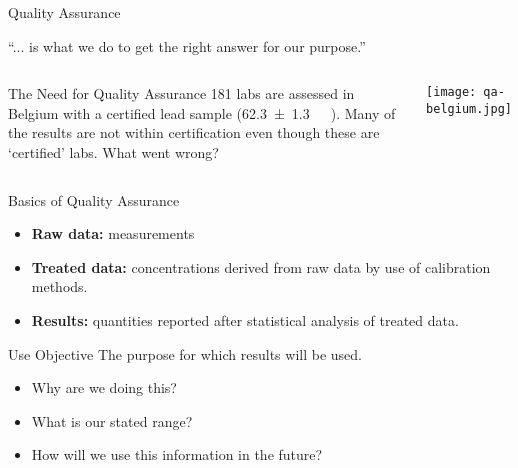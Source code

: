 \documentclass[notes=hide]{beamer}
\begin{document}
\begin{frame}{Quality Assurance}
	\begin{center}
	``... is what we do to get the right answer for our purpose.''
	\end{center}

	\begin{columns}
		\begin{exampleblock}{The Need for Quality Assurance}
			181 labs are assessed in Belgium with a certified lead
			sample (\SI{62.3 +- 1.3}{\nano\Molar}~). Many of the
			results are not within certification even though these
			are `certified' labs. What went wrong?
		\end{exampleblock}
		\begin{center}
			\texttt{[image: qa-belgium.jpg]}
		\end{center}
	\end{columns}
\end{frame}

\begin{frame}{Basics of Quality Assurance}
	\begin{itemize}
		\item \textbf{Raw data:} measurements
		\item \textbf{Treated data:} concentrations derived from raw
			data \alert{by use of calibration methods}.
		\item \textbf{Results:} quantities reported \alert{after
			statistical analysis} of treated data.
	\end{itemize}

	\begin{block}{Use Objective}
		The purpose for which results will be used.

		\begin{itemize}
			\item Why are we doing this?
			\item What is our stated range?
			\item How will we use this information in the future?
		\end{itemize}
	\end{block}
\end{frame}
\end{document}
